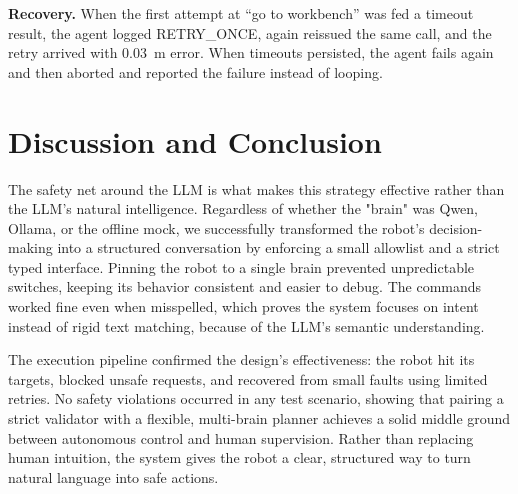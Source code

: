 \documentclass[11pt]{article}
\begin{document}
\textbf{Recovery.} When the first attempt at ``go to workbench'' was fed a
timeout result, the agent logged RETRY\_ONCE, again reissued the same call,
and the retry arrived with 0.03~m error. When timeouts persisted, the agent
fails again and then aborted and reported the failure instead of looping.

\section{Discussion and Conclusion}

The safety net around the LLM is what makes this strategy effective rather than the LLM's natural intelligence. Regardless of whether the "brain" was Qwen, Ollama, or the offline mock, we successfully transformed the robot's decision-making into a structured conversation by enforcing a small allowlist and a strict typed interface. Pinning the robot to a single brain prevented unpredictable switches, keeping its behavior consistent and easier to debug. The commands worked fine even when misspelled, which proves the system focuses on intent instead of rigid text matching, because of the LLM's semantic understanding.

The execution pipeline confirmed the design's effectiveness: the robot hit its targets, blocked unsafe requests, and recovered from small faults using limited retries. No safety violations occurred in any test scenario, showing that pairing a strict validator with a flexible, multi-brain planner achieves a solid middle ground between autonomous control and human supervision. Rather than replacing human intuition, the system gives the robot a clear, structured way to turn natural language into safe actions.
\end{document}

